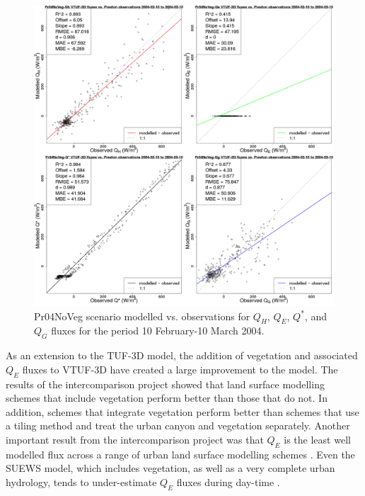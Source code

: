\documentclass[final,3p,times,authoryear]{elsarticle}
\begin{document}
\begin{figure}[!htbp]
\includegraphics[trim = 0mm 0mm 0mm 0mm, clip, scale=0.30]{images/Pr04NoVeg-ErrorPlots.png}
\caption{Pr04NoVeg scenario modelled vs. observations for $Q_{H}$, $Q_{E}$, $Q^{*}$, and $Q_{G}$ fluxes for the period 10 February-10 March 2004. \label{fig:Prestonnovegerror}}    
\end{figure}

As an extension to the TUF-3D model, the addition of vegetation and associated $Q_{E}$ fluxes to VTUF-3D have created a large improvement to the model. The results of the intercomparison project \citep{Grimmond2011,Best2012} showed that land surface modelling schemes that include vegetation perform better than those that do not. In addition, schemes that integrate vegetation perform better than schemes that use a tiling method and treat the urban canyon and vegetation separately. Another important result from the intercomparison project was that $Q_{E}$ is the least well modelled flux across a range of urban land surface modelling schemes \citep{Grimmond2010}. Even the SUEWS model, which includes vegetation, as well as a very complete urban hydrology, tends to under-estimate $Q_{E}$ fluxes during day-time \citep{Jarvi2011}.
\end{document}
